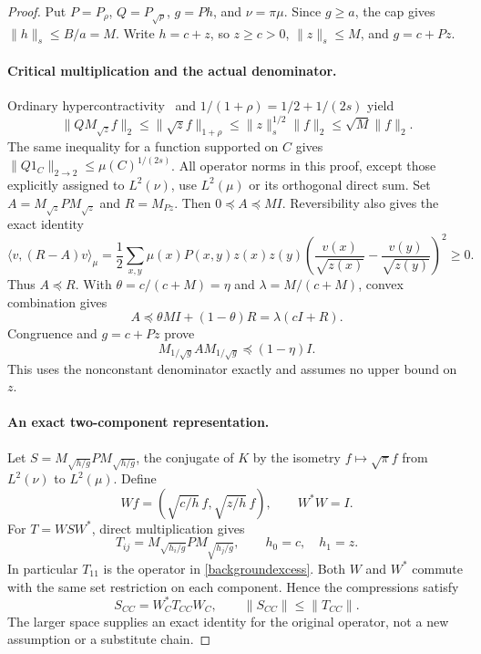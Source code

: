 \begin{proof}
Put $P=P_\rho$, $Q=P_{\sqrt\rho}$, $g=Ph$, and $\nu=\pi\mu$.
Since $g\geq a$, the cap gives $\|h\|_s\leq B/a=M$.
Write $h=c+z$, so $z\geq c>0$, $\|z\|_s\leq M$, and $g=c+Pz$.

\paragraph{Critical multiplication and the actual denominator.}
Ordinary hypercontractivity~\cite{odonnelllecture} and
$1/(1+\rho)=1/2+1/(2s)$ yield
\[
 \|QM_{\sqrt z}f\|_2\leq\|\sqrt z f\|_{1+\rho}
 \leq\|z\|_s^{1/2}\|f\|_2\leq\sqrt M\|f\|_2.
\]
The same inequality for a function supported on $C$ gives
$\|Q1_C\|_{2\to2}\leq\mu(C)^{1/(2s)}$.
All operator norms in this proof, except those explicitly assigned to
$L^2(\nu)$, use $L^2(\mu)$ or its orthogonal direct sum.
Set $A=M_{\sqrt z}PM_{\sqrt z}$ and $R=M_{Pz}$. Then
$0\preceq A\preceq MI$. Reversibility also gives the exact identity
\[
 \langle v,(R-A)v\rangle_\mu
 =\frac12\sum_{x,y}\mu(x)P(x,y)z(x)z(y)
 \left(\frac{v(x)}{\sqrt{z(x)}}-
             \frac{v(y)}{\sqrt{z(y)}}\right)^2\geq0.
\]
Thus $A\preceq R$. With $\theta=c/(c+M)=\eta$ and
$\lambda=M/(c+M)$, convex combination gives
\[
 A\preceq\theta MI+(1-\theta)R=\lambda(cI+R).
\]
Congruence and $g=c+Pz$ prove
\begin{equation}\label{backgroundexcess}
 M_{1/\sqrt g} A M_{1/\sqrt g}\preceq(1-\eta)I.
\end{equation}
This uses the nonconstant denominator exactly and assumes no upper bound
on $z$.

\paragraph{An exact two-component representation.}
Let $S=M_{\sqrt{h/g}}PM_{\sqrt{h/g}}$, the conjugate of $K$ by the
isometry $f\mapsto\sqrt\pi f$ from $L^2(\nu)$ to $L^2(\mu)$.
Define
\[
 Wf=\left(\sqrt{c/h}\,f,\sqrt{z/h}\,f\right),\qquad W^*W=I.
\]
For $T=WSW^*$, direct multiplication gives
\[
 T_{ij}=M_{\sqrt{h_i/g}}PM_{\sqrt{h_j/g}},
 \qquad h_0=c,\quad h_1=z.
\]
In particular $T_{11}$ is the operator in \eqref{backgroundexcess}.
Both $W$ and $W^*$ commute with the same set restriction on each
component. Hence the compressions satisfy
\begin{equation}\label{backgroundcompression}
 S_{CC}=W_C^*T_{CC}W_C,\qquad\|S_{CC}\|\leq\|T_{CC}\|.
\end{equation}
The larger space supplies an exact identity for the original operator,
not a new assumption or a substitute chain.


\end{proof}
